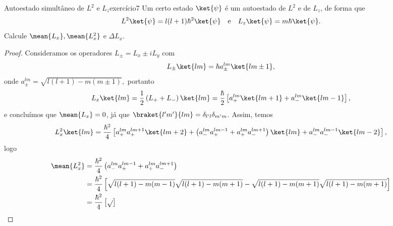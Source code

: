 \begin{exercício}{Autoestado simultâneo de \(L^2\) e \(L_z\)}{exercício7}
    Um certo estado \(\ket{\psi}\) é um autoestado de \(L^2\) e de \(L_z\), de forma que
    \begin{equation*}
        L^2\ket{\psi} = l(l+1)\hbar^2 \ket{\psi}\quad\text{e}\quad L_z\ket{\psi} = m\hbar \ket{\psi}.
    \end{equation*}
    Calcule \(\mean{L_x}, \mean{L_x^2}\) e \(\Delta L_x\).
\end{exercício}
\begin{proof}
    Consideramos os operadores \(L_\pm = L_x \pm i L_y\) com
    \begin{equation*}
        L_\pm \ket{lm} = \hbar a_\pm^{lm}\ket{l m\pm1},
    \end{equation*}
    onde \(a_\pm^{lm} = \sqrt{l(l+1) - m(m\pm1)},\)
    portanto
    \begin{equation*}
        L_x\ket{lm} = \frac12 \left(L_+ + L_-\right)\ket{lm} = \frac{\hbar}{2}\left[a_+^{lm}\ket{lm + 1} + a_-^{lm}\ket{lm -1}\right],
    \end{equation*}
    e concluímos que \(\mean{L_x} = 0\), já que \(\braket{l'm'}{lm} = \delta_{l'l}\delta_{m'm}\). Assim, temos
    \begin{equation*}
        L_x^2 \ket{lm} = \frac{\hbar^2}{4}\left[a_+^{lm}a_+^{lm+1}\ket{l m+2} + \left(a_-^{lm}a_+^{lm-1}+a_+^{lm}a_-^{lm+1}\right)\ket{lm} + a_-^{lm}a_-^{lm-1}\ket{lm-2}\right],
    \end{equation*}
    logo
    \begin{align*}
        \mean{L_x^2} &= \frac{\hbar^2}{4}\left(a_-^{lm}a_+^{lm-1}+a_+^{lm}a_-^{lm+1}\right)\\
                     &= \frac{\hbar^2}{4}\left[\sqrt{l(l+1) - m(m-1)}\sqrt{l(l+1) - m(m+1)} - \sqrt{l(l+1) - m(m+1)}\sqrt{l(l+1) - m(m+1)}\right]\\
                     &= \frac{\hbar^2}{4}\left[\sqrt{}\right]
    \end{align*}
\end{proof}

